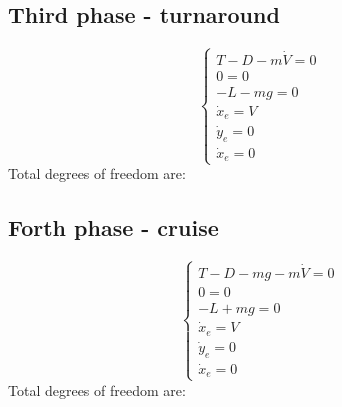 \subsection*{Third phase - turnaround}
\begin{equation}
	\begin{cases}
		T - D -m\dot{V}=0\\
		0=0\\
		-L-mg=0\\
		\dot{x}_e=V\\
		\dot{y}_e=0\\
		\dot{x}_e=0
	\end{cases}
\end{equation}
Total degrees of freedom are:

\subsection*{Forth phase - cruise}
\begin{equation}
	\begin{cases}
		T - D -mg-m\dot{V}=0\\
		0=0\\
		-L+mg=0\\
		\dot{x}_e=V\\
		\dot{y}_e=0\\
		\dot{x}_e=0
	\end{cases}
\end{equation}
Total degrees of freedom are: